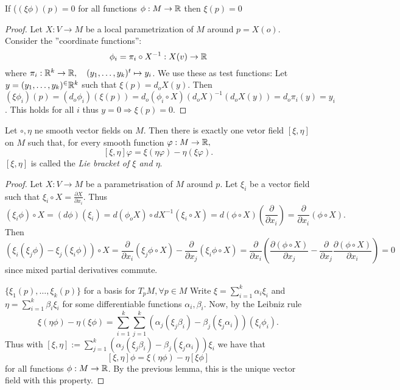 \begin{lemma}
	If ($ (\xi\phi)(p) = 0 $ for all functions $ \phi: M \rightarrow\mathbb R $ then $ \xi(p) = 0 $
\end{lemma}
\begin{proof}
	
	Let $ X : V \rightarrow M $ be a local parametrization of $ M $ around $ p = X(o) $.
	Consider the ''coordinate functions'':
		\[ \phi_i = \pi_i \circ X^{-1}: X(v) \rightarrow \mathbb R \]
	where $ \pi_i:\mathbb R^k \rightarrow \mathbb R, \quad (y_1, \dots, y_k)^t \mapsto y_i $.
	We use these as test functions: Let  $ y = (y_1, \dots, y_k)^ \in \mathbb R^k $ such that $ \xi(p) = d_oX(y). $ Then $ (\xi\phi_i)(p) = (d_o\phi_i)(\xi(p))= d_o(\phi_i \circ X)(d_oX)^{-1}(d_oX(y)) = d_o\pi_i(y) = y_i $. This holds for all $ i $ thus $ y = 0 \Rightarrow \xi(p) = 0 $.
	
\end{proof}

\begin{lemma, definition}
	
	Let $ \circ, \eta $ ne smooth vector fields on $ M $. Then there is exactly one vetor field $ [\xi,\eta] $ on $ M $ such that, for every smooth function $ \varphi:M \rightarrow \mathbb R, $
		\[ [\xi,\eta]\varphi = \xi(\eta\varphi)-\eta(\xi\varphi). \]
	$ [\xi,\eta] $ is called the \emph{Lie bracket of $ \xi $ and $ \eta $}.
	
\end{lemma, definition}

\begin{proof}
	
	Let $ X: V \rightarrow M $ be a parametrisation of $ M $ around $ p $. Let $ \xi_i $ be a vector field such that $ \xi_i \circ X = \frac{\partial X}{\partial x_i}. $ Thus 
		\[ (\xi_i \phi) \circ X = (d\phi)(\xi_i) = d(\phi_oX) \circ dX^{-1}(\xi_i \circ X) = d(\phi \circ X)(\frac{\partial}{\partial x_i}) = \frac{\partial}{\partial x_i}(\phi \circ X). \]
	 Then
	 	\[ (\xi_i(\xi_j \phi) - \xi_j(\xi_i \phi)) \circ X = \frac{\partial}{\partial x_i}(\xi_j\phi \circ X) - \frac{\partial}{\partial x_j}(\xi_i\phi \circ X) = \frac{\partial}{\partial x_i}(\frac{\partial(\phi \circ X)}{\partial x_j} - \frac{\partial}{\partial x_j}\frac{\partial(\phi \circ X)}{\partial x_i}) = 0 \]
	since mixed partial derivatives commute.
	
	$ \{ \xi_1(p), \dots, \xi_k(p) \} $ for a basis for $ T_pM, \forall p \in M $ Write $ \xi = \sum_{i =1}^{k} \alpha_i \xi_i $ and $ \eta = \sum_{i=1}^{k}\beta_i \xi_i $ for some differentiable functions $ \alpha_i,\beta_i $. Now, by the Leibniz rule
		\[ \xi(\eta \phi) - \eta(\xi \phi) = \sum_{i =1}^{k} \sum_{j =1}^{k} (\alpha_j ( \xi_j \beta_i) - \beta_j(\xi_j\alpha_i))(\xi_i\phi_i). \]
	Thus with $ [\xi,\eta] := \sum_{j =1}^{k} (\alpha_j ( \xi_j \beta_i) - \beta_j(\xi_j\alpha_i))\xi_i $ we have that 
		\[ [\xi,\eta]\phi = \xi(\eta\phi)-\eta[\xi\phi] \] for all functions $ \phi: M \rightarrow \mathbb R $. By the previous lemma, this is the unique vector field with this property.
\end{proof}


